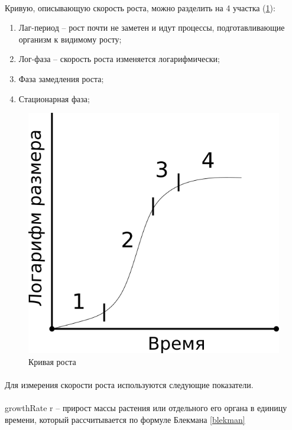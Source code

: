 \paragraph*{}Кривую, описывающую скорость роста, можно разделить на 4 участка (\ris \ref{growth_line}): 

\begin{enumerate}
	\item Лаг-период -- рост почти не заметен и идут процессы, подготавливающие организм к видимому росту;
	\item Лог-фаза -- скорость роста изменяется логарифмически;
	\item Фаза замедления роста;
	\item Стационарная фаза;
\end{enumerate}

\begin{figure}[h!]
  \centering
       \includegraphics[width=0.5\linewidth]{pictures/growth_line}
\caption{Кривая роста}
\label{growth_line}
\end{figure}


\paragraph*{}Для измерения скорости роста используются следующие показатели.

\paragraph*{}\gls{growthRate} r -- прирост массы растения или отдельного его органа в единицу времени, который рассчитывается по формуле Блекмана \ref{blekman} \cite{malinowsky_2004}

